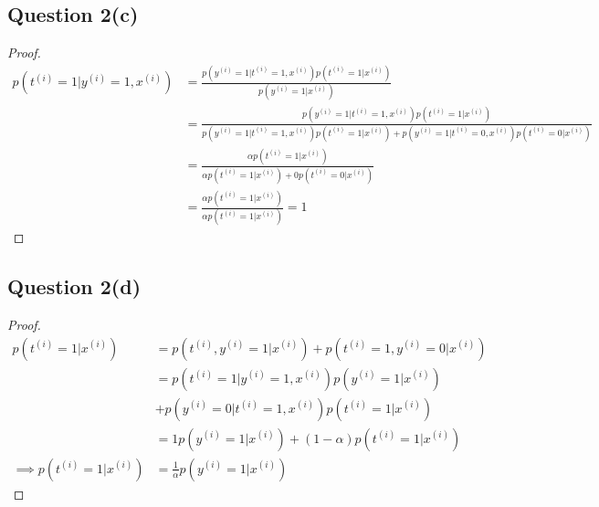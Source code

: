 \documentclass[11pt]{article}
\newcommand{\upi}[0]{^{(i)}}
\begin{document}
	\subsection{Question 2(c)}
	\begin{proof}
		\begin{align}
			p(t\upi=1 | y\upi=1, x\upi) &= \frac{p(y\upi=1|t\upi=1,x\upi)p(t\upi=1|x\upi)}{p(y\upi=1|x\upi)} \\
			&= \frac{
				p(y\upi=1|t\upi=1,x\upi)p(t\upi=1|x\upi)
			}{
				p(y\upi=1|t\upi=1,x\upi)p(t\upi=1|x\upi)
				+ p(y\upi=1|t\upi=0,x\upi)p(t\upi=0|x\upi)
			} \\
			&= \frac{
				\alpha p(t\upi=1|x\upi)
			}{
				\alpha p(t\upi=1|x\upi) + 0p(t\upi=0|x\upi)
			} \\
			&= \frac{
				\alpha p(t\upi=1|x\upi)
			}{
				\alpha p(t\upi=1|x\upi)
			}=1
		\end{align}
	\end{proof}
	
	\newpage
	
	\subsection{Question 2(d)}
	\begin{proof}
		\begin{align}
			p(t\upi=1|x\upi) &= p(t\upi, y\upi=1|x\upi) + p(t\upi=1, y\upi=0|x\upi) \\
			&= p(t\upi=1|y\upi=1, x\upi) p(y\upi=1|x\upi) \\
			&+ p(y\upi=0|t\upi=1, x\upi) p(t\upi=1|x\upi) \\
			&= 1 p(y\upi=1|x\upi) + (1-\alpha) p(t\upi=1|x\upi) \\
			\implies p(t\upi=1|x\upi) &= \frac{1}{\alpha} p(y\upi=1|x\upi)
		\end{align}
	\end{proof}
	
	\newpage
	
\end{document}
